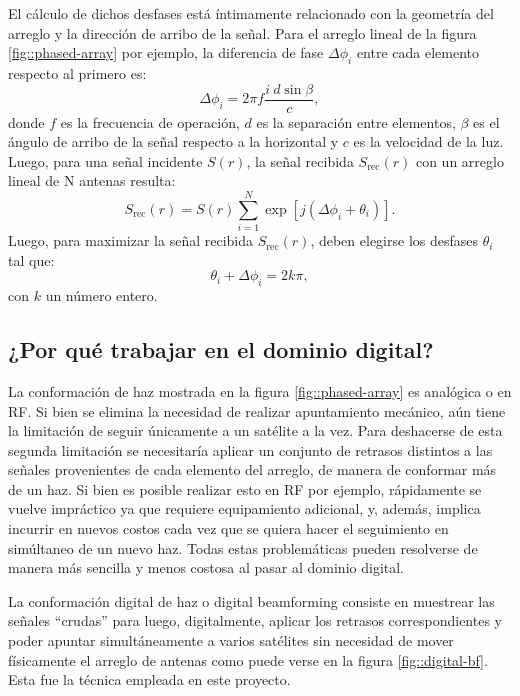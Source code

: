 \documentclass[../../main.tex]{subfiles}
\begin{document}
El cálculo de dichos desfases está íntimamente relacionado con la geometría del arreglo y la dirección de arribo de la señal. Para el arreglo lineal de la figura \ref{fig::phased-array} por ejemplo, la diferencia de fase $\Delta \phi_i$ entre cada elemento respecto al primero es:
\begin{equation}
    \Delta \phi_i = 2 \pi f \frac{i \ d \sin{\beta}}{c},
\end{equation} 
donde $f$ es la frecuencia de operación, $d$ es la separación entre elementos, $\beta$ es el ángulo de arribo de la señal respecto a la horizontal y $c$ es la velocidad de la luz. Luego, para una señal incidente $S(r)$, la señal recibida $S_{\textrm{rec}}(r)$ con un arreglo lineal de N antenas resulta:
\begin{equation}
    S_{\textrm{rec}}(r) = S(r) \sum_{i=1}^{N} \exp[{j (\Delta \phi_i + \theta_i)}].
\end{equation}
Luego, para maximizar la señal recibida $S_{\textrm{rec}}(r)$, deben elegirse los desfases $\theta_i$ tal que:
\begin{equation}
    \theta_i + \Delta \phi_i = 2 k \pi,
\end{equation}
con $k$ un número entero.


\subsection{¿Por qué trabajar en el dominio digital?}

La conformación de haz mostrada en la figura \ref{fig::phased-array} es analógica o en RF. Si bien se elimina la necesidad de realizar apuntamiento mecánico, aún tiene la limitación de seguir únicamente a un satélite a la vez. Para deshacerse de esta segunda limitación se necesitaría aplicar un conjunto de retrasos distintos a las señales provenientes de cada elemento del arreglo, de manera de conformar más de un haz.
Si bien es posible realizar esto en RF  por ejemplo, rápidamente se vuelve impráctico ya que requiere equipamiento adicional, y, además, implica incurrir en nuevos costos cada vez que se quiera hacer el seguimiento en simúltaneo de un nuevo haz.
Todas estas problemáticas pueden resolverse de manera más sencilla y menos costosa al pasar al dominio digital. 

La conformación digital de haz o digital beamforming consiste en muestrear las señales ``crudas'' para luego, digitalmente, aplicar los retrasos correspondientes y poder apuntar simultáneamente a varios satélites sin necesidad de mover físicamente el arreglo de antenas como puede verse en la figura \ref{fig::digital-bf}. Esta fue la técnica empleada en este proyecto.
\end{document}
